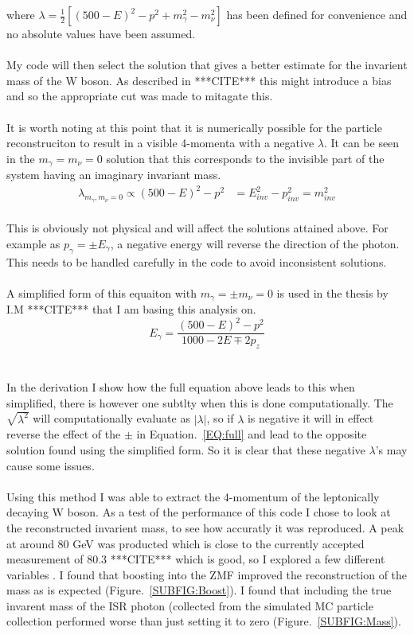  where $ {\lambda} = \frac{1}{2}[{(500 - E)}^2 - {p}^{2} + {m}_{\gamma}^{2} - {m}_{\nu}^{2}] $ has been defined for convenience and no absolute values have been assumed.
\\\\
 My code will then select the solution that gives a better estimate for the invarient mass of the W boson. As described in ***CITE*** this might introduce a bias and so the appropriate cut was made to mitagate this.
\\\\
 It is worth noting at this point that it is numerically possible for the particle reconstruciton to result in a visible 4-momenta with a negative $\lambda$. It can be seen in the ${m}_{\gamma} = {m}_{\nu} =0$ solution that this corresponds to the invisible part of the system having an imaginary invariant mass.
\\
 \begin{align}
 {\lambda}_{{m}_{\gamma}, {m}_{\nu} = 0} \propto {(500 - E)}^2 - {p}^{2} &= {E}_{inv}^2 - {p}_{inv}^{2} = {m}_{inv}^2
      \end{align}
\\
 This is obviously not physical and will affect the solutions attained above. For example as ${p}_{\gamma}= \pm {E}_{\gamma}$,  a negative energy will reverse the direction of the photon. This needs to be handled carefully in the code to avoid inconsistent solutions.
\\\\
 A simplified form of this equaiton with ${m}_{\gamma}= \pm {m}_{\nu} = 0$ is used in the thesis by I.M ***CITE*** that I am basing this analysis on.
 \begin{equation}
   {E}_{\gamma} = \frac{ {(500 - E)}^2 - {p}^{2}}{1000 -2 E  \mp 2{p}_{z}}
\end{equation}
\\\\
In the derivation I show how the full equation above leads to this when simplified, there is however one subtlty when this is done computationally. The $\sqrt{ {\lambda}^{2}}$ will computationally evaluate as $|{\lambda}|$, so if $\lambda$ is negative it will in effect reverse the effect of the $\pm$ in Equation.~\ref{EQ:full} and lead to the opposite solution found using the simplified form. So it is clear that these negative $\lambda$'s may cause some issues.
\\\\
 Using this method I was able to extract the 4-momentum of the leptonically decaying W boson. As a test of the performance of this code I chose to look at the reconstructed invarient mass, to see how accuratly it was reproduced. A peak at around 80 GeV was producted which is close to the currently accepted measurement of 80.3 ***CITE*** which is good, so I explored a few different variables . I found that boosting into the ZMF improved the reconstruction of the mass as is expected (Figure.~\ref{SUBFIG:Boost}). I found that including the true invarent mass of the ISR photon (collected from the simulated MC particle collection performed worse than just setting it to zero (Figure.~\ref{SUBFIG:Mass}).
